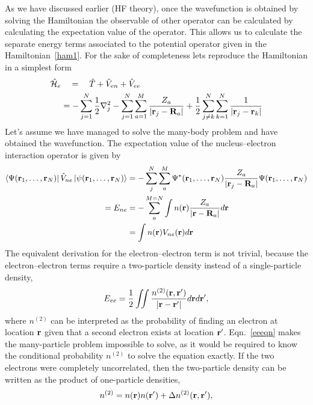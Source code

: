 As we have discussed earlier (HF theory), once the wavefunction is obtained by solving the Hamiltonian the observable of other operator can be calculated by calculating the expectation value of the operator. This allows us to calculate the separate energy terms associated to the potential operator given in the Hamiltonian~\eqref{ham1}. For the sake of completeness lets reproduce the Hamiltonian in a simplest form
\begin{align}
\begin{split}
\hat{\mathcal{H}}_e &\quad = \quad \hat{T} + \hat{V}_{en} + \hat{V}_{ee} \\
     & = -\sum_{j=1}^N \frac{1}{2}\nabla^2_j - \sum_{j=1}^N\sum_{a=1}^M \frac{Z_a}{\abs{\vb{r}_j - \vb{R}_a}} + \frac{1}{2}\sum^N_{j\neq k}\sum^N_{k=1}\frac{1}{\abs{\vb{r}_j - \vb{r}_k}} 
\end{split}
\end{align}
Let's assume we have managed to solve the many-body problem and have obtained the wavefunction. The expectation value of the nucleus--electron interaction operator is given by
\begin{align}
\bra{\Psi(\vb{r}_1,\dots,\vb{r}_N)}\hat{V}_{ne}\ket{\psi(\vb{r}_1,\dots,\vb{r}_N)} &= -\sum_j^N\sum_a^M\Psi^{\ast}(\vb{r}_1,\dots,\vb{r}_N)\frac{Z_a}{\abs{\vb{r}_j - \vb{R}_a}}\Psi(\vb{r}_1,\dots,\vb{r}_N) \nonumber \\
 = E_{ne} & = -\sum_a^{M=N}\int n(\vb{r})\frac{Z_a}{\abs{\vb{r}-\vb{R}_a}} d\vb{r} \nonumber \\
       & = \int n(\vb{r})V_{ne}(\vb{r})d\vb{r}
\end{align}
The equivalent derivation for the electron--electron term is not trivial, because the electron--electron terms require a two-particle density instead of a single-particle density,
\begin{equation}\label{eeeqn}
E_{ee} = \frac{1}{2}\iint \frac{n^{(2)}(\vb{r},\vb{r}')}{\abs{\vb{r}-\vb{r}'}} d\vb{r}d\vb{r}' ,
\end{equation}
where $n^{(2)}$ can be interpreted as the probability of finding an electron at location $\vb{r}$ given that a second electron exists at location $\vb{r}'$. Eqn.~\eqref{eeeqn} makes the many-particle problem impossible to solve, as it would be required to know the conditional probability $n^{(2)}$ to solve the equation exactly. If the two electrons were completely uncorrelated, then the two-particle density can be written as the product of one-particle densities,
\begin{equation}\label{coreqn1}
n^{(2)} = n(\vb{r})n(\vb{r}') + \Delta n^{(2)}(\vb{r},\vb{r}'),
\end{equation}

